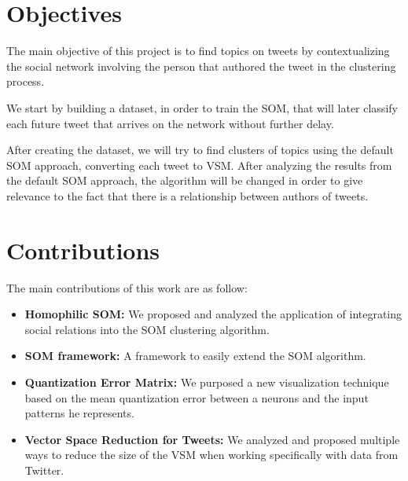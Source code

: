 \section{Objectives}
The main objective of this project is to find topics on tweets by contextualizing the social network involving the person that authored the tweet in the clustering process.

We start by building a dataset, in order to train the \ac{SOM}, that will later classify each future tweet that arrives on the network without further delay.

After creating the dataset, we will try to find clusters of topics using the default \ac{SOM} approach, converting each tweet to \ac{VSM}. After analyzing the results from the default \ac{SOM} approach, the algorithm will be changed in order to give relevance to the fact that there is a relationship between authors of tweets.

\section{Contributions}
The main contributions of this work are as follow:
\begin{itemize}
  \item  \textbf{Homophilic SOM: } We proposed and analyzed the application of integrating social relations into the \ac{SOM} clustering algorithm.
  \item \textbf{SOM framework: } A framework to easily extend the \ac{SOM} algorithm.
  \item \textbf{Quantization Error Matrix: } We purposed a new visualization technique based on the mean quantization error between a neurons and the input patterns he represents. 
  \item \textbf{Vector Space Reduction for Tweets: } We analyzed and proposed multiple ways to reduce the size of the \ac{VSM} when working specifically with data from Twitter.
\end{itemize}


